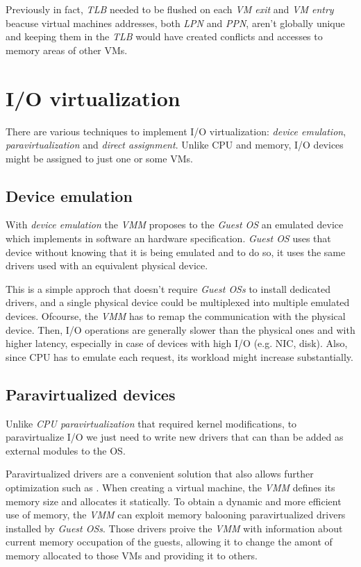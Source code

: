 Previously in fact, \emph{TLB} needed to be flushed on each \emph{VM exit} and
\emph{VM entry} beacuse virtual machines addresses, both \emph{LPN} and \emph{PPN},
aren't globally unique and keeping them in the \emph{TLB} would have created
conflicts and accesses to memory areas of other VMs.

\section{I/O virtualization}
There are various techniques to implement I/O virtualization: \emph{device
emulation}, \emph{paravirtualization} and \emph{direct assignment}. Unlike CPU and
memory, I/O devices might be assigned to just one or some VMs.

\subsection{Device emulation}
With \emph{device emulation} the \emph{VMM} proposes to the \emph{Guest OS} an
emulated device which implements in software an hardware specification.
\emph{Guest OS} uses that device without knowing that it is being emulated and
to do so, it uses the same drivers used with an equivalent physical device.

This is a simple approch that doesn't require \emph{Guest OSs} to install
dedicated drivers, and a single physical device could be multiplexed into
multiple emulated devices. Ofcourse, the \emph{VMM} has to remap the communication
with the physical device. Then, I/O operations are generally slower than the
physical ones and with higher latency, especially in case of devices with high
I/O (e.g. NIC, disk). Also, since CPU has to emulate each request, its workload
might increase substantially.

\subsection{Paravirtualized devices}
Unlike \emph{CPU paravirtualization} that required kernel modifications, to
paravirtualize I/O we just need to write new drivers that can than be added as
external modules to the OS.

Paravirtualized drivers are a convenient solution that also allows further
optimization such as . When creating a virtual machine, the
\emph{VMM} defines its memory size and allocates it statically. To obtain a
dynamic and more efficient use of memory, the \emph{VMM} can exploit memory
balooning paravirtualized drivers installed by \emph{Guest OSs}. Those drivers
proive the \emph{VMM} with information about current memory occupation of the
guests, allowing it to change the amont of memory allocated to those VMs and
providing it to others.

